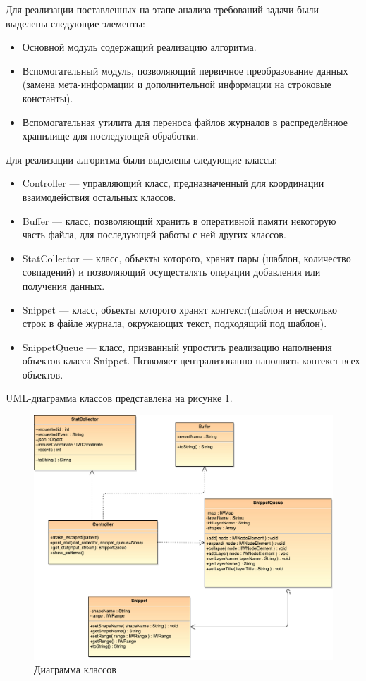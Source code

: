Для реализации поставленных на этапе анализа требований задачи были выделены
следующие элементы:
\begin{itemize}
  \item Основной модуль содержащий реализацию алгоритма.
  \item Вспомогательный модуль, позволяющий первичное преобразование данных
    (замена мета-информации и дополнительной информации на строковые константы).
  \item Вспомогательная утилита для переноса файлов журналов в распределённое
    хранилище для последующей обработки.
\end{itemize}
Для реализации алгоритма были выделены
следующие классы:
\begin{itemize}
  \item Controller --- управляющий класс, предназначенный для координации
    взаимодействия остальных классов.
  \item Buffer --- класс, позволяющий хранить в оперативной памяти некоторую
    часть файла, для последующей работы с ней других классов.
  \item StatCollector --- класс, объекты которого, хранят пары
    (шаблон, количество совпадений) и позволяющий осуществлять операции
    добавления или получения данных.
  \item Snippet --- класс, объекты которого хранят контекст(шаблон и несколько
    строк в файле журнала, окружающих текст, подходящий под шаблон).
  \item SnippetQueue --- класс, призванный упростить реализацию наполнения
    объектов класса Snippet. Позволяет централизованно наполнять контекст всех
    объектов.
\end{itemize}

UML-диаграмма классов представлена на рисунке \ref{fig:umlclasses}.
\begin{figure}[h]
  \centering
  \includegraphics[width=\textwidth]{pics/arch.pdf}
  \caption{Диаграмма классов}
  \label{fig:umlclasses}
\end{figure}

